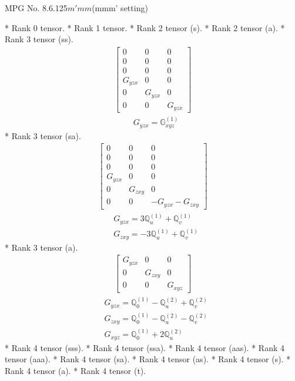 \documentclass[fleqn,8pt,landscape]{jsarticle}
\begin{document}
\setcounter{MaxMatrixCols}{32}

\renewcommand{\tablename}{Table~}
\renewcommand{\figurename}{Figure~}
\begin{center}
\LARGE
MPG No. 8.6.125\quad$m'mm$\quad(mmm' setting)
\end{center}
* Rank 0 tensor.
* Rank 1 tensor.
* Rank 2 tensor (s).
* Rank 2 tensor (a).
* Rank 3 tensor (ss).
\begin{align*}
\begin{bmatrix} 0 & 0 & 0 \\ 0 & 0 & 0 \\ 0 & 0 & 0 \\ G_{yzx} & 0 & 0 \\ 0 & G_{yzx} & 0 \\ 0 & 0 & G_{yzx} \end{bmatrix}
\end{align*}
\begin{align*}
& G_{yzx} = \mathbb{G}_{xyz}^{(1)}
\end{align*}
* Rank 3 tensor (sa).
\begin{align*}
\begin{bmatrix} 0 & 0 & 0 \\ 0 & 0 & 0 \\ 0 & 0 & 0 \\ G_{yzx} & 0 & 0 \\ 0 & G_{zxy} & 0 \\ 0 & 0 & - G_{yzx} - G_{zxy} \end{bmatrix}
\end{align*}
\begin{align*}
& G_{yzx} = 3 \mathbb{Q}_{u}^{(1)} + \mathbb{Q}_{v}^{(1)} \\
& G_{zxy} = - 3 \mathbb{Q}_{u}^{(1)} + \mathbb{Q}_{v}^{(1)}
\end{align*}
* Rank 3 tensor (a).
\begin{align*}
\begin{bmatrix} G_{yzx} & 0 & 0 \\ 0 & G_{zxy} & 0 \\ 0 & 0 & G_{xyz} \end{bmatrix}
\end{align*}
\begin{align*}
& G_{yzx} = \mathbb{Q}_{0}^{(1)} - \mathbb{Q}_{u}^{(2)} + \mathbb{Q}_{v}^{(2)} \\
& G_{zxy} = \mathbb{Q}_{0}^{(1)} - \mathbb{Q}_{u}^{(2)} - \mathbb{Q}_{v}^{(2)} \\
& G_{xyz} = \mathbb{Q}_{0}^{(1)} + 2 \mathbb{Q}_{u}^{(2)}
\end{align*}
* Rank 4 tensor (sss).
* Rank 4 tensor (ssa).
* Rank 4 tensor (aas).
* Rank 4 tensor (aaa).
* Rank 4 tensor (sa).
* Rank 4 tensor (as).
* Rank 4 tensor (s).
* Rank 4 tensor (a).
* Rank 4 tensor (t).
\end{document}
